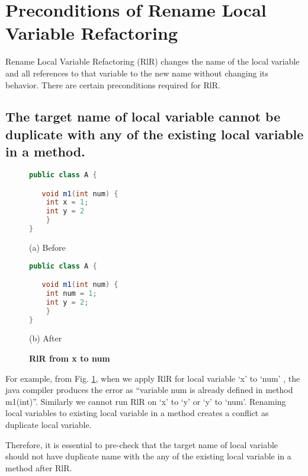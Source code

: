  \section{\textbf{Preconditions of Rename Local Variable Refactoring}}
 
 
Rename Local Variable Refactoring (RlR) changes the name of the local variable and all references to that variable to the new name without changing its behavior. There are certain preconditions required for RlR.

 \subsection{The target name of local variable cannot be duplicate with any of the existing local variable in a method.}
 
\begin{figure}[th]
\centering
\begin{minipage}[t]{0.45\linewidth}
\begin{lstlisting}[language=java, basicstyle=\scriptsize\ttfamily,frame=single]
public class A {

   void m1(int num) {
	int x = 1;
	int y = 2
    }
}
\end{lstlisting}
\centering(a) Before
\end{minipage}
\hfill
\begin{minipage}[t]{0.45\linewidth}
\begin{lstlisting}[language=java, basicstyle=\scriptsize\ttfamily,frame=single]
public class A {

   void m1(int num) {
	int num = 1;
	int y = 2;
    }
}
\end{lstlisting}
\centering(b) After
\end{minipage}
\caption{\textbf{RlR from x to num}}
\label{figure:precond5_1}
\end{figure}

For example, from Fig. \ref{figure:precond5_1}, when we apply RlR for local variable `x' to `num' , the java compiler produces the error as ``variable num is already defined in method m1(int)''. Similarly we cannot run RlR on `x'  to `y' or `y'  to `num'. Renaming local variables to existing local variable in a method creates a conflict as duplicate local variable.

Therefore, it is essential to pre-check that the target name of local variable should not have duplicate name with the any of the existing local variable in a method after RlR.
